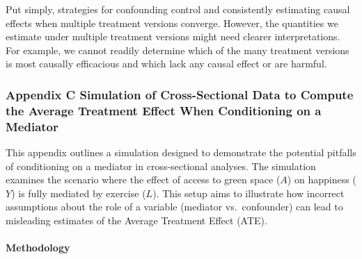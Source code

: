 \documentclass[
  singlecolumn]{article}
\let\oldparagraph\paragraph
\renewcommand{\paragraph}[1]{\oldparagraph{#1}\mbox{}}
\begin{document}
Put simply, strategies for confounding control and consistently
estimating causal effects when multiple treatment versions converge.
However, the quantities we estimate under multiple treatment versions
might need clearer interpretations. For example, we cannot readily
determine which of the many treatment versions is most causally
efficacious and which lack any causal effect or are harmful.

\newpage{}

\subsubsection{Appendix C Simulation of Cross-Sectional Data to Compute
the Average Treatment Effect When Conditioning on a
Mediator}\label{appendix-c}

This appendix outlines a simulation designed to demonstrate the
potential pitfalls of conditioning on a mediator in cross-sectional
analyses. The simulation examines the scenario where the effect of
access to green space (\(A\)) on happiness (\(Y\)) is fully mediated by
exercise (\(L\)). This setup aims to illustrate how incorrect
assumptions about the role of a variable (mediator vs.~confounder) can
lead to misleading estimates of the Average Treatment Effect (ATE).

\paragraph{Methodology}\label{methodology}
\end{document}
